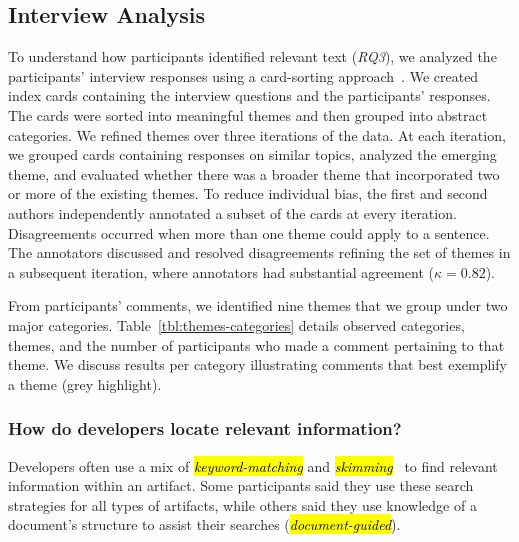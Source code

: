 
\subsection{Interview Analysis}

To understand how participants identified relevant text (\textit{RQ3}), we analyzed the participants'
interview responses using a card-sorting approach~\cite{spencer2009sorting}.
We created index cards containing the interview questions and the participants' responses.
The cards were sorted into meaningful themes and then grouped into abstract categories.
We refined themes over three iterations of the data.
At each  iteration, we grouped cards containing responses on similar topics, analyzed the emerging theme, and evaluated
whether there was a broader theme that incorporated two or more of the existing themes.
To reduce individual bias, the first and second authors independently annotated a subset of the cards at every iteration.
Disagreements occurred when more than one theme could apply to a sentence.
The annotators discussed and resolved disagreements refining the set of themes in a subsequent iteration, where annotators had substantial agreement ($\kappa=0.82$).





From participants' comments, we identified nine themes that we group under two major categories.
Table~\ref{tbl:themes-categories} details observed categories, themes, and the number of participants who made a comment pertaining to that theme.
We discuss results per category illustrating comments that best exemplify a theme (grey highlight).





\afterpage{

}



\subsubsection{How do developers locate relevant information?}
\label{cp3:search-strategies}

Developers often use a mix of \hl{\textit{keyword-matching}} and \hl{\textit{skimming}}~\cite{Starke2009, Ko2006a} to find relevant information within an artifact. 
Some participants said they use these search strategies for all types of artifacts, while others said they use knowledge of a document's structure to assist their searches (\hl{\textit{document-guided}}).


